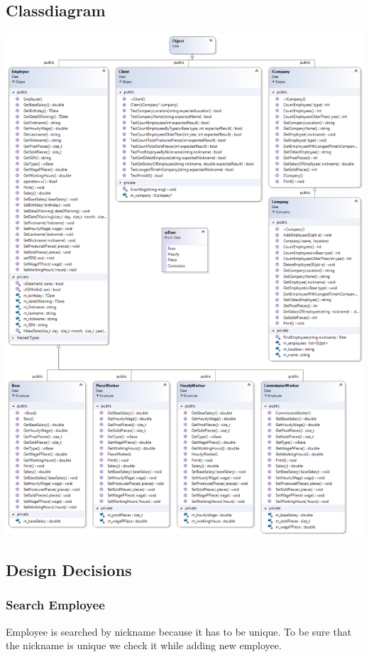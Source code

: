 \subsection{Classdiagram}
\includegraphics[scale=0.65]{ClassDiagram}

\subsection{Design Decisions}
\subsubsection{}
\subsubsection{}
\subsubsection{Search Employee}
Employee is searched by nickname because it has to be unique. To be sure that the nickname is unique we check it while adding new employee.


